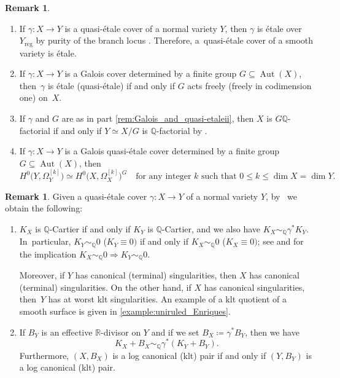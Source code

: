 \documentclass[JEP,XML,SOM,Unicode,published]{cedram}
\theoremstyle{plain}
\theoremstyle{definition}
\newtheorem{rem}[thm]{Remark}
\newcommand{\Q}{\mathbb{Q}}
\newcommand{\R}{\mathbb{R}}
\DeclareMathOperator{\Aut}{Aut}
\begin{document}
\skpt
\begin{rem}
\label{rem:Galois_and_quasi-etale}
\begin{enumerate}
\item\label{rem:Galois_and_quasi-etalei}
If $\gamma \colon X \to Y$ is a quasi-étale cover of a normal variety $Y$, then $\gamma$ is étale over $Y_\text{reg}$ by purity of the branch locus \cite[Tag 0BMB]{Stacks}. Therefore, a~quasi-étale cover of a smooth variety is étale.

\item\label{rem:Galois_and_quasi-etaleii}
If $\gamma \colon X \to Y$ is a Galois cover determined by a finite group $G \subseteq \Aut(X)$, then~$\gamma$ is étale (\resp quasi-étale) if and only if $G$ acts freely (\resp freely in codimension one) on~$X$.

\item\label{rem:Galois_and_quasi-etaleiii}
If $\gamma$ and $G$ are as in part \eqref{rem:Galois_and_quasi-etaleii}, then $X$ is $G\Q$-factorial if and only if $Y \simeq X /G$ is $\Q$\nobreakdash-factorial by \cite[Lem.\,1.1.3]{Pro21}.

\item\label{rem:Galois_and_quasi-etaleiv}
If $\gamma \colon X \to Y$ is a Galois quasi-étale cover determined by a finite group $G \subseteq \Aut(X)$, then
\[
H^0 \bigl(Y,\Omega_Y^{[k]} \bigr) \simeq H^0 \bigl(X,\Omega_X^{[k]} \bigr)^G \quad \text{for any integer $k$ such that } 0 \leq k \leq \dim X = \dim Y.
\]
\end{enumerate}
\end{rem}

\begin{rem}
\label{rem:singularities_quasi-etale_cover}
Given a quasi-étale cover $\gamma \colon X \to Y$ of a normal variety $Y$, by~\cite[Prop.\,5.20]{KM98} we obtain the following:
\begin{enumerate}
\item\label{rem:singularities_quasi-etale_coveri}
$K_X$ is $\Q$\nobreakdash-Cartier if and only if $K_Y$ is $\Q$\nobreakdash-Cartier, and we also have $K_X \sim_\Q \gamma^* K_Y$. In~particular, $K_Y \sim_\Q 0$ (\resp $K_Y \equiv 0)$ if and only if $K_X \sim_\Q 0$ (\resp $K_X \equiv 0)$; see \cite[Ch.\,7, Th.\,2.18]{Liu02book} and \cite[Tag 02RT]{Stacks} for the implication \hbox{$K_X \!\sim_\Q\! 0 \!\Rightarrow\! K_Y \!\sim_\Q\! 0$}.

Moreover, if $Y$ has canonical (\resp terminal) singularities, then $X$ has canonical (\resp terminal) singularities. On the other hand, if $X$ has canonical singularities, then~$Y$ has at worst klt singularities. An example of a klt quotient of a smooth surface is given in \autoref{example:uniruled_Enriques}.

\item\label{rem:singularities_quasi-etale_coverii}
If $B_Y$ is an effective $\R$\nobreakdash-divisor on $Y$ and if we set $B_X \coloneqq \gamma^* B_Y$, then we have
\[
K_X + B_X \sim_\Q \gamma^* (K_Y + B_Y).
\]
Furthermore, $(X,B_X)$ is a log canonical (\resp klt) pair if and only if $(Y,B_Y)$ is a log canonical (\resp klt) pair.
\end{enumerate}
\end{rem}
\end{document}
